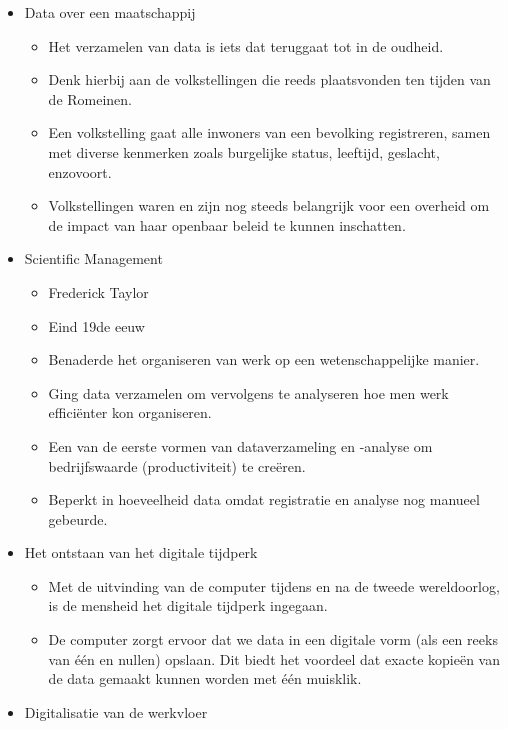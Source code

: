 \documentclass[]{tufte-book}
\providecommand{\tightlist}{%
  \setlength{\itemsep}{0pt}\setlength{\parskip}{0pt}}
\begin{document}
\begin{itemize}
\tightlist
\item
  Data over een maatschappij

  \begin{itemize}
  \tightlist
  \item
    Het verzamelen van data is iets dat teruggaat tot in de oudheid.
  \item
    Denk hierbij aan de volkstellingen die reeds plaatsvonden ten tijden van de Romeinen.
  \item
    Een volkstelling gaat alle inwoners van een bevolking registreren, samen met diverse kenmerken zoals burgelijke status, leeftijd, geslacht, enzovoort.
  \item
    Volkstellingen waren en zijn nog steeds belangrijk voor een overheid om de impact van haar openbaar beleid te kunnen inschatten.
  \end{itemize}
\item
  Scientific Management

  \begin{itemize}
  \tightlist
  \item
    Frederick Taylor
  \item
    Eind 19de eeuw
  \item
    Benaderde het organiseren van werk op een wetenschappelijke manier.
  \item
    Ging data verzamelen om vervolgens te analyseren hoe men werk efficiënter kon organiseren.
  \item
    Een van de eerste vormen van dataverzameling en -analyse om bedrijfswaarde (productiviteit) te creëren.
  \item
    Beperkt in hoeveelheid data omdat registratie en analyse nog manueel gebeurde.
  \end{itemize}
\item
  Het ontstaan van het digitale tijdperk

  \begin{itemize}
  \tightlist
  \item
    Met de uitvinding van de computer tijdens en na de tweede wereldoorlog, is de mensheid het digitale tijdperk ingegaan.
  \item
    De computer zorgt ervoor dat we data in een digitale vorm (als een reeks van één en nullen) opslaan. Dit biedt het voordeel dat exacte kopieën van de data gemaakt kunnen worden met één muisklik.
  \end{itemize}
\item
  Digitalisatie van de werkvloer


\end{itemize}
\end{document}
